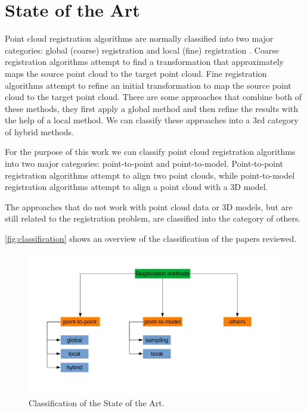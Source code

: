 

    \chapter{State of the Art}
    \label{chap:State of the Art}
    Point cloud registration algorithms are normally classified into two major categories: global (coarse) registration and local (fine) registration \cite{Quan_2020_com,Kim_2011_fully}.
    Coarse registration algorithms attempt to find a transformation that approximately maps the source point cloud to the target point cloud. 
    Fine registration algorithms attempt to refine an initial transformation to map the source point cloud to the target point cloud.
    There are some approaches that combine both of these methods, they first apply a global method and then refine the results with the help of a local method. 
    We can classify these approaches into a 3rd category of hybrid methods. 
    \par
    
    For the purpose of this work we can classify point cloud registration algorithms into two major categories:
    point-to-point and point-to-model.
    Point-to-point registration algorithms attempt to align two point clouds, while point-to-model registration algorithms attempt to align a point cloud with a 3D model.

    The approaches that do not work with point cloud data or 3D models, but are still related to the registration problem, are classified into the category of others.

    \autoref{fig:classification} shows an overview of the classification of the papers reviewed.
    
    \begin{figure}[H]
        \includegraphics[width=\textwidth]{images/Classification.jpg}
        \caption{Classification of the State of the Art.}
        \label{fig:classification}
    \end{figure}

